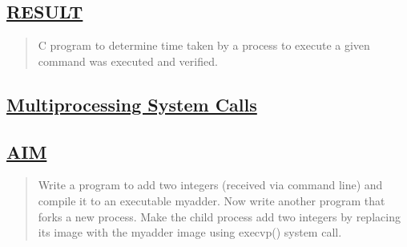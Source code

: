 \documentclass[a4paper, 12pt]{article}
\begin{document}

\subsection*{\underline{RESULT}}
\begin{quote}
C program to determine time taken by a process to execute a given command was executed and verified.
\end{quote}

\newpage
\begin{center}
\section*{\LARGE \textbf{\underline{Multiprocessing System Calls}}} 
\end{center}

\subsection*{\underline{AIM}}
\begin{quote}
Write a program to add two integers (received via command line) and compile it to an executable myadder. Now write another program that forks a new process. Make the child process add two integers by replacing its image with the myadder image using execvp() system call.
\end{quote}
\end{document}
